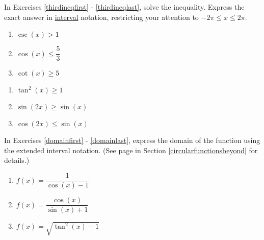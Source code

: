 
In Exercises \ref{thirdineqfirst} - \ref{thirdineqlast}, solve the inequality.  Express the exact answer in \underline{interval} notation, restricting your attention to $-2\pi \leq x \leq 2\pi$.

\begin{multicols}{3}

\begin{enumerate}

\setcounter{enumi}{\value{HW}}

\item $\csc \left( x \right) > 1$  \label{thirdineqfirst}
\item  $\cos(x) \leq \dfrac{5}{3}$
\item  $\cot(x) \geq 5$ 

\setcounter{HW}{\value{enumi}}

\end{enumerate}

\end{multicols}

\begin{multicols}{3}

\begin{enumerate}

\setcounter{enumi}{\value{HW}}

\item $\tan^{2} \left( x \right) \geq 1$
\item $\sin(2x) \geq \sin(x)$
\item $\cos(2x) \leq \sin(x)$ \label{thirdineqlast}

\setcounter{HW}{\value{enumi}}

\end{enumerate}

\end{multicols}

In Exercises \ref{domainfirst} - \ref{domainlast}, express the domain of the function using the extended interval notation. (See page \pageref{extendedinterval} in Section \ref{circularfunctionsbeyond} for details.)

\begin{multicols}{3}

\begin{enumerate}

\setcounter{enumi}{\value{HW}}

\item $f(x) = \dfrac{1}{\cos(x) - 1}$  \label{domainfirst}
\item $f(x) = \dfrac{\cos(x)}{\sin(x) + 1}$
\item $f(x) = \sqrt{\tan^{2}(x) - 1}$ 

\setcounter{HW}{\value{enumi}}

\end{enumerate}

\end{multicols}

